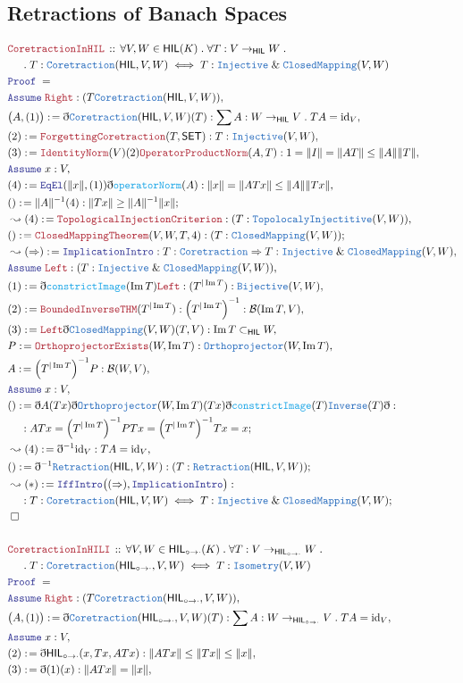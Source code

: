 \documentclass[12pt]{scrartcl}
\newcommand{\TYPE}[1]{\textcolor{NavyBlue}{\mathtt{#1}}}
\newcommand{\FUNC}[1]{\textcolor{Cerulean}{\mathtt{#1}}}
\newcommand{\LOGIC}[1]{\textcolor{Blue}{\mathtt{#1}}}
\newcommand{\THM}[1]{\textcolor{Maroon}{\mathtt{#1}}}
\renewcommand{\.}{\; . \;}
\newcommand{\de}{: \kern 0.1pc =}
\newcommand{\Theorem}[2]{& \THM{#1} \, :: \, #2 \\ & \Proof = \\ }
\newcommand{\NewLine}{\\ & \kern 1pc}
\newcommand{\Page}[1]{\begin{align*} #1 \end{align*} \newpage   }
\newcommand{ \bd }{ \ByDef }
\renewcommand{\And}{\; \& \;}
\DeclareMathOperator*{\id}{id}
\DeclareMathOperator*{\im}{Im}
\newcommand{\Say}[3]{& #1 \de #2 : #3, \\}
\newcommand{\Conclude}[3]{& #1 \de #2 : #3; \\}
\newcommand{\Derive}[3]{& \leadsto #1 \de #2 : #3, \\}
\newcommand{\DeriveConclude}[3]{& \leadsto #1 \de #2 : #3 ; \\}
\newcommand{\A}{\LOGIC{Assume} \;}
\newcommand{\Assume}[2]{& \A #1 : #2, \\}
\newcommand{\QED}{\; \square}
\newcommand{\EndProof}{& \QED \\}
\newcommand{\ByDef}{\eth}
\newcommand{\Proof}{\LOGIC{Proof} \; }
\newcommand{\HIL}{\textsf{HIL}}
\newcommand{\HILI}{{\textsf{HIL}_{\circ \to \cdot}}}
\newcommand{\B}{\mathcal{B}}
\begin{document}
\subsection{Retractions of Banach Spaces}
\Page{
\Theorem{CoretractionInHIL}{\forall V,W \in \HIL(K) \. \forall T  
 : V \to_{\HIL} W \. \NewLine \.
 T : \TYPE{Coretraction}(\HIL,V,W) \iff T : \TYPE{Injective} \And \TYPE{ClosedMapping}(V,W)
}
\Assume{ \THM{Right} }{ (T \TYPE{Coretraction}(\HIL,V,W))}
\Say{\big(A,(1) \big)}{\bd \TYPE{Coretraction}(\HIL,V,W)(T)}{ \sum A : W \to_\HIL V \. TA  = {\id}_V}
\Say{(2)}{\THM{ForgettingCoretraction}(T,\mathsf{SET})}{T : \TYPE{Injective}(V,W)}
\Say{(3)}{\THM{IdentityNorm}(V)(2)\THM{OperatorProductNorm}(A,T)}{ 1 = \| I \|  = \| AT \| \le \| A \| \| T \|}
\Assume{x}{V}
\Say{(4)}{ \LOGIC{EqEl}( \|x\|, (1) )\bd \FUNC{operatorNorm}(A)}{ \| x \| = \| A T x \| \le \| A \| \| Tx \|}
\Conclude{()}{\|A\|^{-1}(4)}{\| T x \| \ge \| A \|^{-1} \| x \| }
\Derive{(4)}{\THM{TopologicalInjectionCriterion}}{(T : \TYPE{TopolocalyInjectitive}(V,W))}
\Conclude{()}{\THM{ClosedMappingTheorem}(V,W,T,4)}{(T : \TYPE{ClosedMapping}(V,W))}
\Derive{(\Rightarrow)}{\LOGIC{ImplicationIntro}}{T : \TYPE{Coretraction} \Rightarrow  T : \TYPE{Injective} \And \TYPE{ClosedMapping}(V,W)}
\Assume{\THM{Left}}{ (T : \TYPE{Injective} \And \TYPE{ClosedMapping}(V,W)) }
\Say{(1)}{\bd \FUNC{constrictImage}(\im T) \THM{Left}}{(T^{|\im T}) : \TYPE{Bijective}(V,W)}
\Say{(2)}{ \THM{BoundedInverseTHM}(T^{| \im T})}{\Big(T^{|\im T}\Big)^{-1} : \B(\im T, V)}
\Say{(3)}{ \THM{Left}\bd\TYPE{ClosedMapping}(V,W)(T,V)}{\im T \subset_{\HIL} W }
\Say{ P }{ \THM{OrthoprojectorExists}(W, \im T)}{\TYPE{Orthoprojector}(W, \im T)}
\Say{A}{ \Big( T^{| \im T} \Big)^{-1} P}{\B(W,V)}
\Assume{x}{V}
\Conclude{()}{\bd A (Tx)\bd \TYPE{Orthoprojector}(W,\im T)(T x) \bd 
\FUNC{constrictImage}(T)\TYPE{Inverse}(T)\bd}{ 
\NewLine :
ATx = \Big( T^{| \im T} \Big)^{-1} P Tx =  \Big( T^{| \im T} \Big)^{-1} T x  = x}
\Derive{(4)}{\bd^{-1} {\id}_V }{ TA = {\id} _V}
\Conclude{()}{\bd^{-1} \TYPE{Retraction}(\HIL,V,W)}{(T : \TYPE{Retraction}(\HIL,V,W))}
\DeriveConclude{(*)}{\LOGIC{IffIntro}\big((\Rightarrow),\LOGIC{ImplicationIntro}\big)}
{ \NewLine :
  T : \TYPE{Coretraction}(\HIL,V,W) \iff T : \TYPE{Injective} \And \TYPE{ClosedMapping}(V,W)
}
\EndProof
\\
\Theorem{CoretractionInHILI}{\forall V,W \in \HILI(K) \. \forall T  
 : V \to_{\HILI} W \. \NewLine \.
 T : \TYPE{Coretraction}(\HILI,V,W) \iff T : \TYPE{Isometry}(V,W)
}
\Assume{ \THM{Right} }{ (T \TYPE{Coretraction}(\HILI,V,W))}
\Say{\big(A,(1) \big)}{\bd \TYPE{Coretraction}(\HILI,V,W)(T)}{ \sum A : W \to_\HILI V \. TA  = {\id}_V} 
\Assume{x}{V}
\Say{(2)}{ \bd \HILI (x,Tx,ATx)}{\| AT x \| \le \| Tx \| \le \| x \|}
\Say{(3)}{\bd(1)(x)}{\| AT x \|  =  \|x \|}
}
\end{document}
